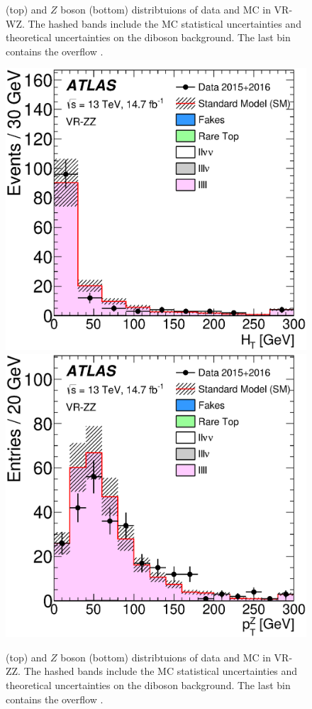 \begin{centering}
\begin{figure}[htbp]
\caption{\HT (top) and $Z$ boson \pt (bottom) distribtuions of data and \ac{MC} in VR-WZ. The hashed bands include the MC statistical uncertainties and theoretical uncertainties on the diboson background. The last bin contains the overflow \cite{this_paper}. \label{fig:diboson_wz}}
\end{figure}
\end{centering}

\begin{centering}
\begin{figure}[htbp]
\centering
\includegraphics[width=.9\textwidth]{figures/dibosons/figaux_11c.eps}
\includegraphics[width=.9\textwidth]{figures/dibosons/figaux_11d.eps}
\caption{\HT (top) and $Z$ boson \pt (bottom) distribtuions of data and \ac{MC} in VR-ZZ. The hashed bands include the MC statistical uncertainties and theoretical uncertainties on the diboson background. The last bin contains the overflow \cite{this_paper}. \label{fig:diboson_zz}}
\end{figure}
\end{centering}

